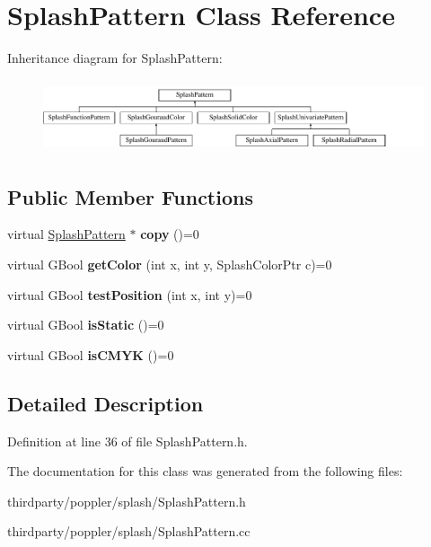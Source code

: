 \hypertarget{class_splash_pattern}{}\section{Splash\+Pattern Class Reference}
\label{class_splash_pattern}
Inheritance diagram for Splash\+Pattern\+:\begin{figure}[H]
\begin{center}
\leavevmode
\includegraphics[height=2.167742cm]{class_splash_pattern}
\end{center}
\end{figure}
\subsection*{Public Member Functions}
\begin{DoxyCompactItemize}
\item 
\mbox{\label{class_splash_pattern_a03d9bf74c3c7c1dafb93b0ed35e58d3d}} 
virtual \hyperlink{class_splash_pattern}{Splash\+Pattern} $\ast$ {\bfseries copy} ()=0
\item 
\mbox{\label{class_splash_pattern_aa2d0686b1b64dd369df9e2fd1ee85dc1}} 
virtual G\+Bool {\bfseries get\+Color} (int x, int y, Splash\+Color\+Ptr c)=0
\item 
\mbox{\label{class_splash_pattern_aa5f36650a86155b4fb72e3e010b3ee5a}} 
virtual G\+Bool {\bfseries test\+Position} (int x, int y)=0
\item 
\mbox{\label{class_splash_pattern_a60e8968c97e399a70a8a4433e4e618d0}} 
virtual G\+Bool {\bfseries is\+Static} ()=0
\item 
\mbox{\label{class_splash_pattern_a9c7141cfe3573267b2cd4e83fd1f3425}} 
virtual G\+Bool {\bfseries is\+C\+M\+YK} ()=0
\end{DoxyCompactItemize}


\subsection{Detailed Description}


Definition at line 36 of file Splash\+Pattern.\+h.



The documentation for this class was generated from the following files\+:\begin{DoxyCompactItemize}
\item 
thirdparty/poppler/splash/Splash\+Pattern.\+h\item 
thirdparty/poppler/splash/Splash\+Pattern.\+cc\end{DoxyCompactItemize}
